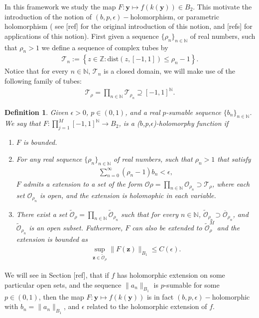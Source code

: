 \documentclass{article}
\newtheorem{definition}[theorem]{Definition}
\newcommand{\todo}[1]{{\color{red}[#1]}}
\newcommand{\IN}{{\mathbb N}}
\newcommand{\IZ}{{\mathbb Z}}
\newcommand{\by}{\bm{y}}
\begin{document}
In this framework we study the map $F : \by \mapsto f(k(\by)) \in  B_2$. This motivate the introduction of the notion of $(b,p,\epsilon)-$holomorphism, or parametric holomorphism ( see  \todo{ref} for the original introduction of this notion, and \todo{refs} for applications of this notion). First given a sequence $\{\rho_n\}_{n \in \IN}$ of real numbers, such that $\rho_n  >1$ we define a sequence of complex tubes by 
\begin{align*}
\mathcal{T}_n := \left\lbrace z \in \IZ : \text{dist}(z,[-1,1]) \leq \rho_n-1 \right\rbrace.
\end{align*}
Notice that for every $n \in \IN$, $\mathcal{T}_n$ is a closed domain, we will make use of the following family of tubes: 
\begin{align*}
\mathcal{T}_{\rho} = \prod_{n \in \IN} \mathcal{T}_{\rho_n} \supseteq [-1,1]^{\IN}.
\end{align*}
\begin{definition}
\label{def:bepholom}
Given $\epsilon >0$, $p \in (0,1)$, and a real $p$-sumable sequence $\{b_n\}_{n \in \IN}$. We say that $F:\prod_{j=1}^M[-1,1]^\IN\rightarrow B_2$, is a ($b$,p,$\epsilon$)-holomorphy function if
\begin{enumerate}
\item $F$ is bounded.
\item 
For any real sequence $\{\rho_n\}_{n \in \IN}$ of real numbers, such that $\rho_n >1$ that satisfy 
\begin{align*}
\sum_{n =0}^\infty (\rho_n -1) b_n < \epsilon, 
\end{align*}
$F$ admits a extension to a set of the form $\mathcal{O}\rho =  \prod_{n \in \IN} \mathcal{O}_{\rho_n} \supset \mathcal{T}_\rho$, where each set $\mathcal{O}_{\rho_n}$ is open, and the extension is holomophic in each variable. 
\item 
There exist a set $\widetilde{\mathcal{O}}_\rho =  \prod_{n \in \IN} \widetilde{\mathcal{O}}_{\rho_n}$ such that for every $n \in \IN$, $\widetilde{\mathcal{O}}_{\rho_n} \supset \overline{\mathcal{O}}_{\rho_n}$, and $\widetilde{\mathcal{O}}_{\rho_n}$ is an open subset. Futhermore, $F$ can also be extended to $\widetilde{\mathcal{O}}_\rho^M$ and the extension is bounded as 
\begin{align*}
\sup_{\mathbf{z} \in \widetilde{\mathcal{O}}_\rho } \| F(\mathbf{z})\|_{B_1} \leq C(\epsilon).
\end{align*}
\end{enumerate}
\end{definition}
We will see in Section \todo{ref}, that  if $f$ has holomorphic extension on some particular open sets, and the sequence $\|a_n\|_{B_1}$ is $p$-sumable for some $p \in(0,1)$, then the map $F :\by \mapsto f(k(\by))$ is in fact $(b,p,\epsilon)-$holomorphic with  $b_n = \|a_n\|_{B_1}$, and $\epsilon$ related to the holomorphic extension of $f$. 
\end{document}
